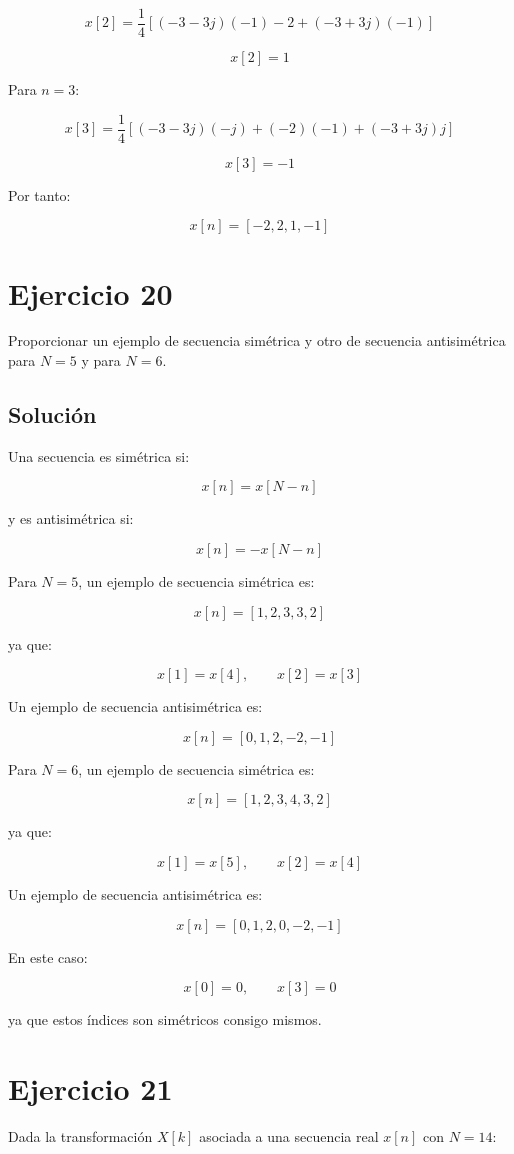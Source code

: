 \documentclass[fleqn]{article}
\begin{document}
	\[
	x[2]
	=
	\frac{1}{4}
	\left[
	(-3-3j)(-1)
	-2
	+
	(-3+3j)(-1)
	\right]
	\]

	\[
	x[2]=1
	\]

	Para $n=3$:

	\[
	x[3]
	=
	\frac{1}{4}
	\left[
	(-3-3j)(-j)
	+
	(-2)(-1)
	+
	(-3+3j)j
	\right]
	\]

	\[
	x[3]=-1
	\]

	Por tanto:

	\[
	\boxed{
	x[n]=[-2,2,1,-1]
	}
	\]

\section{Ejercicio 20}
	Proporcionar un ejemplo de secuencia simétrica y otro de secuencia antisimétrica
	para $N=5$ y para $N=6$.

	\subsection{Solución}

	Una secuencia es simétrica si:

	\[
	x[n]=x[N-n]
	\]

	y es antisimétrica si:

	\[
	x[n]=-x[N-n]
	\]

	Para $N=5$, un ejemplo de secuencia simétrica es:

	\[
	\boxed{
	x[n]=[1,2,3,3,2]
	}
	\]

	ya que:

	\[
	x[1]=x[4],
	\qquad
	x[2]=x[3]
	\]

	Un ejemplo de secuencia antisimétrica es:

	\[
	\boxed{
	x[n]=[0,1,2,-2,-1]
	}
	\]

	Para $N=6$, un ejemplo de secuencia simétrica es:

	\[
	\boxed{
	x[n]=[1,2,3,4,3,2]
	}
	\]

	ya que:

	\[
	x[1]=x[5],
	\qquad
	x[2]=x[4]
	\]

	Un ejemplo de secuencia antisimétrica es:

	\[
	\boxed{
	x[n]=[0,1,2,0,-2,-1]
	}
	\]

	En este caso:

	\[
	x[0]=0,
	\qquad
	x[3]=0
	\]

	ya que estos índices son simétricos consigo mismos.

\section{Ejercicio 21}
	Dada la transformación $X[k]$ asociada a una secuencia real $x[n]$ con $N=14$:
\end{document}
